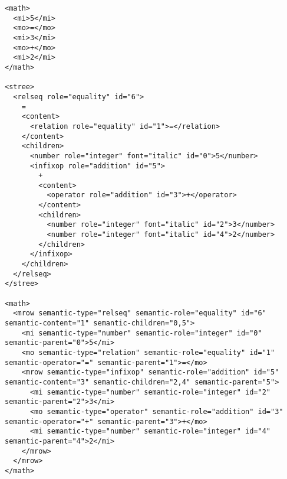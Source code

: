 \documentclass{article}
\begin{document}
\begin{lstlisting}
<math>
  <mi>5</mi>
  <mo>=</mo>
  <mi>3</mi>
  <mo>+</mo>
  <mi>2</mi>
</math>

<stree>
  <relseq role="equality" id="6">
    =
    <content>
      <relation role="equality" id="1">=</relation>
    </content>
    <children>
      <number role="integer" font="italic" id="0">5</number>
      <infixop role="addition" id="5">
        +
        <content>
          <operator role="addition" id="3">+</operator>
        </content>
        <children>
          <number role="integer" font="italic" id="2">3</number>
          <number role="integer" font="italic" id="4">2</number>
        </children>
      </infixop>
    </children>
  </relseq>
</stree>

<math>
  <mrow semantic-type="relseq" semantic-role="equality" id="6" semantic-content="1" semantic-children="0,5">
    <mi semantic-type="number" semantic-role="integer" id="0" semantic-parent="0">5</mi>
    <mo semantic-type="relation" semantic-role="equality" id="1" semantic-operator="=" semantic-parent="1">=</mo>
    <mrow semantic-type="infixop" semantic-role="addition" id="5" semantic-content="3" semantic-children="2,4" semantic-parent="5">
      <mi semantic-type="number" semantic-role="integer" id="2" semantic-parent="2">3</mi>
      <mo semantic-type="operator" semantic-role="addition" id="3" semantic-operator="+" semantic-parent="3">+</mo>
      <mi semantic-type="number" semantic-role="integer" id="4" semantic-parent="4">2</mi>
    </mrow>
  </mrow>
</math>
\end{lstlisting}
\end{document}
